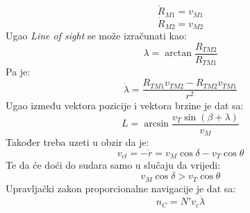 \begin{equation}
    \dot{R}_{M1}=v_{M1}
\end{equation}
\begin{equation}
    \dot{R}_{M2}=v_{M2}
\end{equation}
Ugao \textit{Line of sight} se može izračunati kao:
\begin{equation}
    \lambda = \arctan{\frac{R_{TM2}}{R_{TM1}}}
\end{equation}
Pa je: 
\begin{equation}
    \dot{\lambda}=\frac{R_{TM1}v_{TM2}-R_{TM2}v_{TM1}}{r^2}
\end{equation}
Ugao između vektora pozicije i vektora brzine je dat sa:
\begin{equation}
    L=\arcsin{\frac{v_T\sin{(\beta+\lambda)}}{v_M}}
\end{equation}
Također treba uzeti u obzir da je:
\begin{equation}
    v_{cl}=-\dot{r}=v_M\cos\delta - v_T\cos\theta
\end{equation}
Te da će doći do sudara samo u slučaju da vrijedi: 
\begin{equation}
    v_M\cos\delta > v_T\cos\theta
\end{equation}
Upravljački zakon proporcionalne navigacije je dat sa:
\begin{equation}
    n_C=N'v_c\dot{\lambda}
\end{equation}

